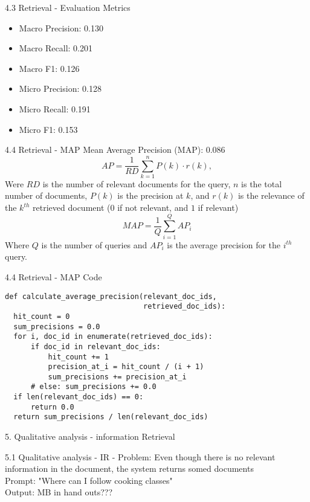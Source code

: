 \documentclass{beamer}
\begin{document}
\begin{frame}{4.3 Retrieval - Evaluation Metrics}
  \begin{itemize}
    \item Macro Precision: 0.130
    \item Macro Recall: 0.201
    \item Macro F1: 0.126
    \item Micro Precision: 0.128
    \item Micro Recall: 0.191
    \item Micro F1: 0.153
  \end{itemize}
\end{frame}

\begin{frame}{4.4 Retrieval - MAP}
  Mean Average Precision (MAP): 0.086
  \begin{equation}
    AP = \frac{1}{RD} \sum_{k=1}^{n} P(k) \cdot r(k),
  \end{equation}
  Were $RD$  is the number of relevant documents for the query, $n$ is the total number of documents, $P(k)$
  is the precision at $k$, and $r(k)$ is the relevance of the $k^{th}$ retrieved document ($0$ if not relevant, and $1$ if
  relevant)
  \begin{equation}
    MAP = \frac{1}{Q} \sum_{i=1}^{Q} AP_i
  \end{equation}
  Where $Q$ is the number of queries and $AP_i$ is the average precision for the $i^{th}$ query.
\end{frame}

\begin{frame}[fragile]{4.4 Retrieval - MAP Code}
  \begin{verbatim}
def calculate_average_precision(relevant_doc_ids,
                                retrieved_doc_ids):
  hit_count = 0
  sum_precisions = 0.0
  for i, doc_id in enumerate(retrieved_doc_ids):
      if doc_id in relevant_doc_ids:
          hit_count += 1
          precision_at_i = hit_count / (i + 1)
          sum_precisions += precision_at_i
      # else: sum_precisions += 0.0
  if len(relevant_doc_ids) == 0:
      return 0.0
  return sum_precisions / len(relevant_doc_ids)
  \end{verbatim}
\end{frame}

\begin{frame} {5. Qualitative analysis - information Retrieval}
\end{frame}

\begin{frame} {5.1 Qualitative analysis - IR - }
  Problem: Even though there is no relevant information in the document, the system returns somed documents\\
  Prompt: "Where can I follow cooking classes"\\
  Output: MB in hand outs???
\end{frame}
\end{document}
